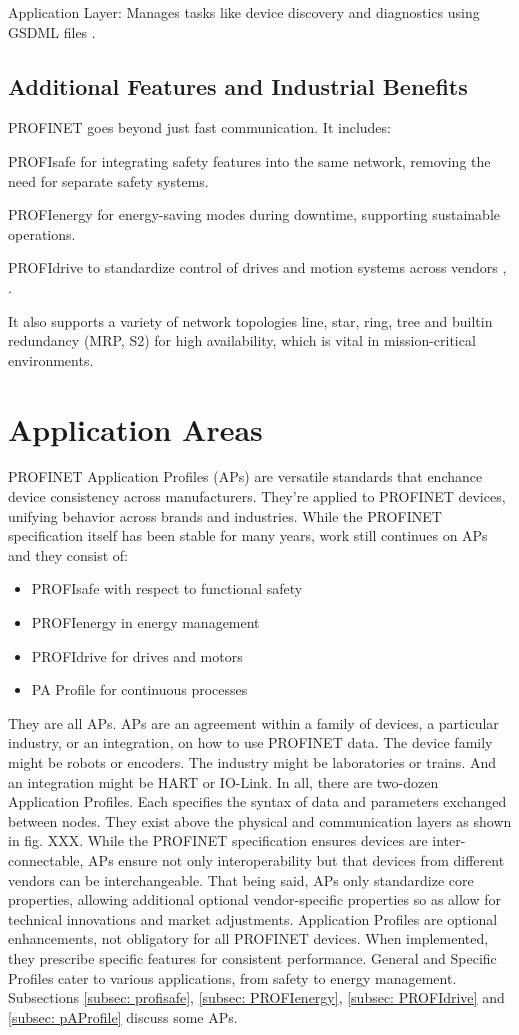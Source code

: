 \documentclass[conference]{IEEEtran}
\begin{document}
Application Layer: Manages tasks like device discovery and diagnostics using GSDML files \cite{patzke1998fieldbus}.

\subsection{Additional Features and Industrial Benefits}
PROFINET goes beyond just fast communication. It includes:

PROFIsafe for integrating safety features into the same network, removing the need for separate safety systems.

PROFIenergy for energy-saving modes during downtime, supporting sustainable operations.

PROFIdrive to standardize control of drives and motion systems across vendors \cite{galloway2012industrial}, \cite{jasperneite2007limits}.

It also supports a variety of network topologies line, star, ring, tree and builtin redundancy (MRP, S2) for high availability, which is vital in mission-critical environments.

\section{Application Areas}
PROFINET Application Profiles (APs) are versatile standards that enchance device consistency across manufacturers. They're applied to PROFINET devices, unifying behavior across brands and industries.
While the PROFINET  specification itself has been stable for many years, work still continues on APs and they consist of:
\begin{itemize}
    \item PROFIsafe with respect to functional safety
    \item PROFIenergy in energy management
    \item PROFIdrive  for drives and motors
    \item PA Profile for continuous processes  
\end{itemize}
They are all APs. APs are an agreement within  a family of devices, a particular industry, or an integration, on how to use PROFINET data.  The device family might be robots or encoders. The industry might be laboratories or trains. And  an integration might be HART or IO-Link. In all, there are two-dozen Application Profiles. Each  specifies the syntax of data and parameters exchanged between nodes. They exist above the physical and communication layers as  shown in fig. XXX. While the PROFINET specification ensures devices are  inter-connectable, APs ensure not only interoperability but that devices from  different vendors can be interchangeable. That being said, APs only standardize  core properties, allowing additional optional vendor-specific properties so as allow for  technical innovations and market adjustments. Application Profiles are optional enhancements, not obligatory for all PROFINET devices. When implemented, they prescribe specific features for consistent performance. General and Specific Profiles cater to various applications, from safety to energy management. Subsections \ref{subsec: profisafe}, \ref{subsec: PROFIenergy}, \ref{subsec: PROFIdrive} and \ref{subsec: pAProfile} discuss some  APs.
\end{document}
